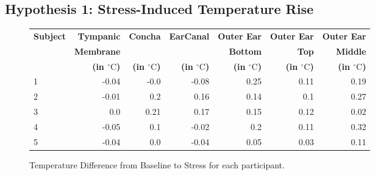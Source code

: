 \subsection{Hypothesis 1: Stress-Induced Temperature Rise}
\label{subsec:Evaluation:Study2:Hypothesis1}

\begin{figure}[t]
    \centering
    
    \begin{subtable}{\textwidth}
        \centering
        \begin{tabular}{|l|rrrrrr|}
        \hline
        \textbf{Subject} & \textbf{Tympanic} & \textbf{Concha} & \textbf{EarCanal} & \textbf{Outer Ear} & \textbf{Outer Ear} & \textbf{Outer Ear} \\
             & \textbf{Membrane} &  &  & \textbf{Bottom} & \textbf{Top} & \textbf{Middle} \\   
             &\textbf{(in \(^\circ\text{C}\))} & \textbf{(in \(^\circ\text{C}\))} & \textbf{(in \(^\circ\text{C}\))} & \textbf{(in \(^\circ\text{C}\))} & \textbf{(in \(^\circ\text{C}\))} & \textbf{(in \(^\circ\text{C}\))} \\
        \hline
        1 & -0.04 & -0.0 & -0.08 & 0.25 & 0.11 & 0.19 \\
        2 & -0.01 & 0.2 & 0.16 & 0.14 & 0.1 & 0.27 \\
        3 & 0.0 & 0.21 & 0.17 & 0.15 & 0.12 & 0.02 \\
        4 & -0.05 & 0.1 & -0.02 & 0.2 & 0.11 & 0.32 \\
        5 & -0.04 & 0.0 & -0.04 & 0.05 & 0.03 & 0.11 \\
        \hline
        \end{tabular}
        \caption{Temperature Difference from Baseline to Stress for each participant.}
        \label{subsec:Evaluation:Study2:Hypothesis1:temp_diff_sitting_to_stress_all}
    \end{subtable}
    
    \vspace{1em} %
    

\end{figure}
